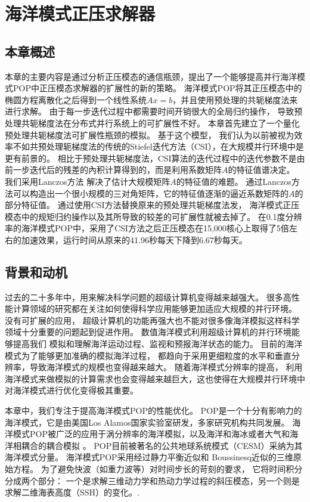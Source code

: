 \chapter{海洋模式正压求解器}
\label{cha:barosSolver}

\section{本章概述}
本章的主要内容是通过分析正压模态的通信瓶颈，提出了一个能够提高并行海洋模式POP中正压模态求解器的扩展性的新的策略。 
 海洋模式POP将其正压模态中的椭圆方程离散化之后得到一个线性系统$Ax=b$，并且使用预处理的共轭梯度法来进行求解。 
 由于每一步迭代过程中都需要时间开销很大的全局归约操作， 导致预处理共轭梯度法在分布式并行系统上的可扩展性不好。 
 本章首先建立了一个量化预处理共轭梯度法可扩展性瓶颈的模拟。
 基于这个模型， 我们认为以前被视为效率不如共预处理轭梯度法的传统的Stiefel迭代方法（CSI），在大规模并行环境中是更有前景的。
相比于预处理共轭梯度法，CSI算法的迭代过程中的迭代参数不是由前一步迭代后的残差的內积计算得到的，而是利用系数矩阵$A$的特征值谱决定。 
我们采用Lanczos方法 解决了估计大规模矩阵$A$的特征值的难题。 
通过Lanczos方法可以构造出一个很小规模的三对角矩阵，它的特征值逐渐的逼近系数矩阵的$A$的部分特征值。 
通过使用CSI方法替换原来的预处理共轭梯度法发， 海洋模式正压模态中的规矩归约操作以及其所导致的较差的可扩展性就被去掉了。 
在0.1度分辨率的海洋模式POP中，采用了CSI方法之后正压模态在15,000核心上取得了5倍左右的加速效果，运行时间从原来的41.96秒每天下降到6.67秒每天。 



\section{背景和动机}
\label{sec:baroBackgroud} 

过去的二十多年中，用来解决科学问题的超级计算机变得越来越强大。 
很多高性能计算领域的研究都在关注如何使得科学应用能够更加适应大规模的并行环境。 
没有可扩展的应用， 超级计算机的功能再强大也不能对很多像海洋模拟这样科学领域十分重要的问题起到促进作用。 
数值海洋模式利用超级计算机的并行环境能够提高我们 模拟和理解海洋运动过程、监视和预报海洋状态的能力。 
目前的海洋模式为了能够更加准确的模拟海洋过程， 都趋向于采用更细粒度的水平和垂直分辨率，导致海洋模式的规模也变得越来越大。 
随着海洋模式分辨率的提高， 利用海洋模式来做模拟的计算需求也会变得越来越巨大，这也使得在大规模并行环境中对海洋模式进行优化变得极其重要。 


本章中，我们专注于提高海洋模式POP的性能优化。 
POP是一个十分有影响力的海洋模式，它是由美国Los Alamos国家实验室研发，多家研究机构共同发展。
海洋模式POP被广泛的应用于涡分辨率的海洋模拟\cite{mcclean2002eulerian, stark2004towards}，以及海洋和海冰或者大气和海洋相耦合的耦合模拟  \cite{May2002preliminary}。 
POP目前被著名的公共地球系统模式（CESM）采纳为其海洋模式分量。  
海洋模式POP采用经过静力平衡近似和  Boussinesq近似的三维原始方程。 
为了避免快波（如重力波等）对时间步长的苛刻的要求， 它将时间积分分成两个部分： 一个是求解三维动力学和热动力学过程的斜压模态，另一个则是求解二维海表高度（SSH）的变化。\cite{smith2010parallel}.

